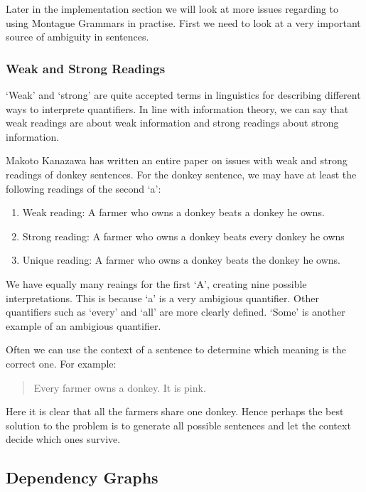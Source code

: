 \documentclass[12pt]{article}
\begin{document}
Later in the implementation section we will look at more issues regarding to using Montague Grammars in practise. First we need to look at a very important source of ambiguity in sentences.

\subsubsection{Weak and Strong Readings}

`Weak' and `strong' are quite accepted terms in linguistics for describing different ways to interprete quantifiers. In line with information theory, we can say that weak readings are about weak information and strong readings about strong information.

Makoto Kanazawa has written an entire paper on issues with weak and strong readings of donkey sentences\cite{kanazawa1994weak}. For the donkey sentence, we may have at least the following readings of the second `a':
\begin{enumerate}
\item Weak reading: A farmer who owns a donkey beats a donkey he owns. 
\item Strong reading: A farmer who owns a donkey beats every donkey he owns 
\item Unique reading: A farmer who owns a donkey beats the donkey he owns. 
\end{enumerate}

We have equally many reaings for the first `A', creating nine possible interpretations. This is because `a' is a very ambigious quantifier. Other quantifiers such as `every' and `all' are more clearly defined. `Some' is another example of an ambigious quantifier.

Often we can use the context of a sentence to determine which meaning is the correct one. For example:
\begin{quotation}
Every farmer owns a donkey. It is pink.
\end{quotation}
Here it is clear that all the farmers share one donkey. Hence perhaps the best solution to the problem is to generate all possible sentences and let the context decide which ones survive.

\subsection{Dependency Graphs}
\end{document}
